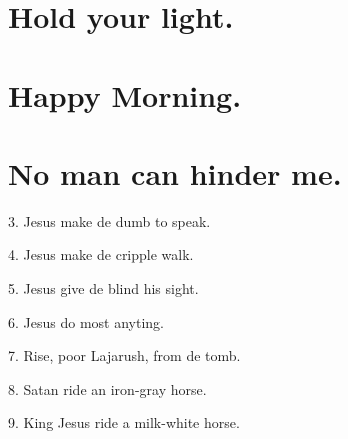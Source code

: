 \documentclass[a5paper,10pt]{book}
\begin{document}
\newpage
\section{Hold your light.}
\thispagestyle{empty}

\begin{song}

\end{song}

\newpage
\section{Happy Morning.}
\thispagestyle{empty}

\begin{song}

\end{song}

\newpage
\section{No man can hinder me.}
\thispagestyle{empty}

\begin{song}
\end{song}

\begin{stanza}
\item[3.]
  Jesus make de dumb to speak.

\item[4.]
  Jesus make de cripple walk.

\item[5.]
  Jesus give de blind his sight.

\item[6.]
  Jesus do most anyting.

\item[7.]
  Rise, poor Lajarush, from de tomb.

\item[8.]
  Satan ride an iron-gray horse.

\item[9.]
  King Jesus ride a milk-white horse.
\end{stanza}
\end{document}
